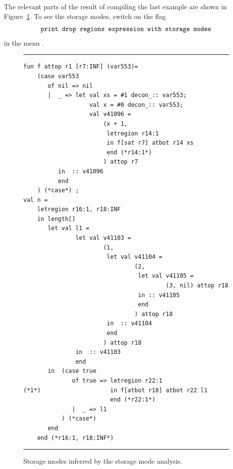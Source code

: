 \documentclass[12pt]{book}
\begin{document}
The relevant parts of the result of compiling the last example are
shown in Figure~\ref{sma1.fig}.  To see the storage modes, switch on
the flag
%
$$\hbox{\tt print drop regions expression with storage modes}$$
in the menu .


\begin{figure}
\hrule \medskip
\begin{verbatim}
fun f attop r1 [r7:INF] (var553)= 
    (case var553 
       of nil => nil
       |  _ => let val xs = #1 decon_:: var553; 
                   val x = #0 decon_:: var553; 
                   val v41096 = 
                       (x + 1, 
                        letregion r14:1 
                        in f[sat r7] atbot r14 xs 
                        end (*r14:1*)
                       ) attop r7
          in  :: v41096
          end 
    ) (*case*) ; 
val n = 
    letregion r16:1, r18:INF 
    in length[] 
       let val l1 = 
               let val v41103 = 
                       (1, 
                        let val v41104 = 
                                (2, 
                                 let val v41105 = 
                                         (3, nil) attop r18 
                                 in :: v41105 
                                 end 
                                ) attop r18
                        in  :: v41104
                        end 
                       ) attop r18
               in  :: v41103
               end 
       in  (case true 
              of true => letregion r22:1 
(*1*)                    in f[atbot r18] atbot r22 l1 
                         end (*r22:1*)
              |  _ => l1
           ) (*case*) 
       end  
    end (*r16:1, r18:INF*)
\end{verbatim}
\caption{Storage modes inferred by the storage mode analysis.}
\label{sma1.fig}
\medskip
\hrule
\end{figure}
\end{document}

